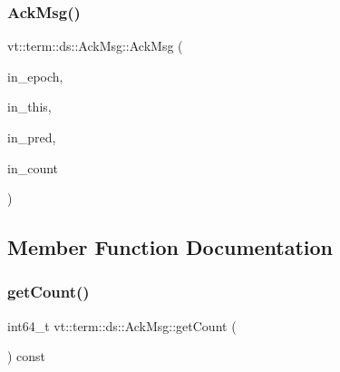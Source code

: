 \mbox{\label{structvt_1_1term_1_1ds_1_1_ack_msg_afa493ae15ad599ef9ed892ab697345d5}} 
\subsubsection{\texorpdfstring{Ack\+Msg()}{AckMsg()}\hspace{0.1cm}{\footnotesize\ttfamily [2/2]}}
{\footnotesize\ttfamily vt\+::term\+::ds\+::\+Ack\+Msg\+::\+Ack\+Msg (\begin{DoxyParamCaption}\item[{\hyperlink{namespacevt_a81d11b28122d43bf9834577e4a06440f}{Epoch\+Type} const \&}]{in\+\_\+epoch,  }\item[{\hyperlink{namespacevt_a866da9d0efc19c0a1ce79e9e492f47e2}{Node\+Type} const \&}]{in\+\_\+this,  }\item[{\hyperlink{namespacevt_a866da9d0efc19c0a1ce79e9e492f47e2}{Node\+Type} const \&}]{in\+\_\+pred,  }\item[{int64\+\_\+t const}]{in\+\_\+count }\end{DoxyParamCaption})\hspace{0.3cm}{\ttfamily [inline]}}



\subsection{Member Function Documentation}
\mbox{\label{structvt_1_1term_1_1ds_1_1_ack_msg_a28125b7b99d15c26ebaef2c34f6a5daa}} 
\subsubsection{\texorpdfstring{get\+Count()}{getCount()}}
{\footnotesize\ttfamily int64\+\_\+t vt\+::term\+::ds\+::\+Ack\+Msg\+::get\+Count (\begin{DoxyParamCaption}{ }\end{DoxyParamCaption}) const\hspace{0.3cm}{\ttfamily [inline]}}

